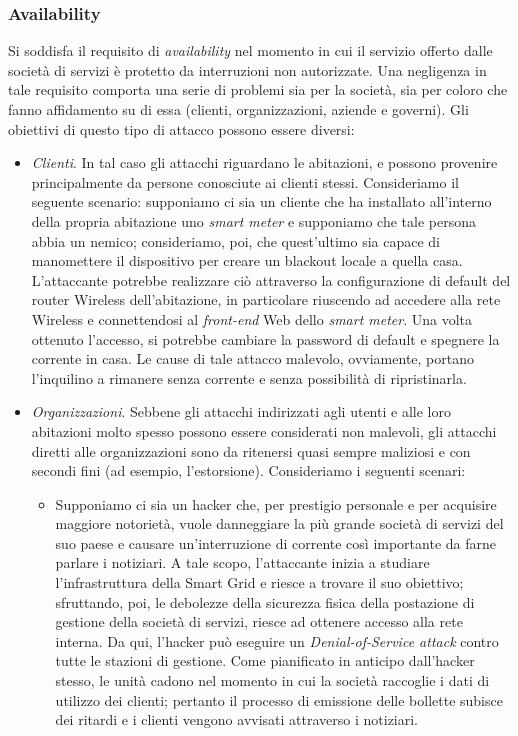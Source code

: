 \subsubsection{Availability}
Si soddisfa il requisito di \textit{availability} nel momento in cui il servizio offerto dalle società di servizi è protetto da interruzioni non autorizzate. Una negligenza in tale requisito comporta una serie di problemi sia per la società, sia per coloro che fanno affidamento su di essa (clienti, organizzazioni, aziende e governi). Gli obiettivi di questo tipo di attacco possono essere diversi:
\begin{itemize}
\item \textit{Clienti}. In tal caso gli attacchi riguardano le abitazioni, e possono provenire principalmente da persone conosciute ai clienti stessi. Consideriamo il seguente scenario: supponiamo ci sia un cliente che ha installato all'interno della propria abitazione uno \textit{smart meter} e supponiamo che tale persona abbia un nemico; consideriamo, poi, che quest'ultimo sia capace di manomettere il dispositivo per creare un blackout locale a quella casa. L'attaccante potrebbe realizzare ciò attraverso la configurazione di default del router Wireless dell'abitazione, in particolare riuscendo ad accedere alla rete Wireless e connettendosi al \textit{front-end} Web dello \textit{smart meter}. Una volta ottenuto l'accesso, si potrebbe cambiare la password di default e spegnere la corrente in casa. Le cause di tale attacco malevolo, ovviamente, portano l'inquilino a rimanere senza corrente e senza possibilità di ripristinarla.
\item \textit{Organizzazioni}. Sebbene gli attacchi indirizzati agli utenti e alle loro abitazioni molto spesso possono essere considerati non malevoli, gli attacchi diretti alle organizzazioni sono da ritenersi quasi sempre maliziosi e con secondi fini (ad esempio, l'estorsione). Consideriamo i seguenti scenari:
	\begin{itemize}
	\item Supponiamo ci sia un hacker che, per prestigio personale e per acquisire maggiore notorietà, vuole danneggiare la più grande società di servizi del suo paese e causare un'interruzione di corrente così importante da farne parlare i notiziari. A tale scopo, l'attaccante inizia a studiare l'infrastruttura della Smart Grid e riesce a trovare il suo obiettivo; sfruttando, poi, le debolezze della sicurezza fisica della postazione di gestione della società di servizi, riesce ad ottenere accesso alla rete interna. Da qui, l'hacker può eseguire un \textit{Denial-of-Service attack} contro tutte le stazioni di gestione. Come pianificato in anticipo dall'hacker stesso, le unità cadono nel momento in cui la società raccoglie i dati di utilizzo dei clienti; pertanto il processo di emissione delle bollette subisce dei ritardi e i clienti vengono avvisati attraverso i notiziari.

\end{itemize}
\end{itemize}
